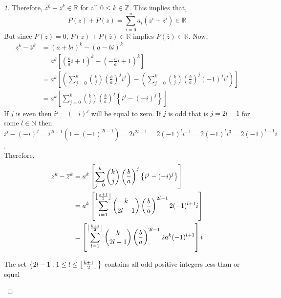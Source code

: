 \begin{proof}[1]
    Therefore, $z^{k} + \overline{z}^{k} \in \mathbb{R}$ for all $0\leq k\in \mathbb{Z}$. This implies that,
    \begin{equation*}
        P(z) + P(\overline{z}) = \sum_{i=0}^{n} a_{i} \left( z^{i} + \overline{z}^{i} \right) \in \mathbb{R} 
    \end{equation*}
    But since $P(z)=0$, $P(z) + P(\overline{z}) \in \mathbb{R}$ implies $P(\overline{z})\in \mathbb{R}$. Now,
    \begin{align*}
        z^{k} - \overline{z}^{k} &= (a+bi)^{k} - (a-bi)^{k} \\
                                 &= a^{k}\left[\left(\frac{b}{a}i + 1\right)^{k} - \left(-\frac{b}{a}i + 1\right)^{k} \right] \\
                                 &= a^{k}
                                 \left[ \left( \sum_{j=0}^{k} {k \choose j} \left(\frac{b}{a}\right)^{j}i^{j}\right) -
                                 \left( \sum_{j=0}^{k} {k \choose j} \left(\frac{b}{a}\right)^{j}(-1)^{j}i^{j} \right)\right] \\
                                 &= a^{k}
                                 \left[\sum_{j=0}^{k} {k \choose j}\left(\frac{b}{a}\right)^{j} \left\{i^{j} - (-i)^{j} 
                                 \right\} \right]
    \end{align*}
    If $j$ is even then $i^{j} - (-i)^{j}$ will be equal to zero. If $j$ is odd that is $j=2l-1$ for some $l\in \mathbb{N}$ then 
    $i^{j} - (-i)^{j} = i^{2l-1} \left( 1 - (-1)^{2l-1} \right)=2i^{2l-1} = 2(-1)^{l}i^{-1} = 2(-1)^{l}i^{3} = 2(-1)^{l+1}i$. \\
    Therefore,
    \begin{align*}
        z^{k} - \overline{z}^{k} &= a^{k} \left[\sum_{j=0}^{k} {k \choose j}\left(\frac{b}{a}\right)^{j} \left\{i^{j} - (-i)^{j} 
                                           \right\} \right] \\
                                           &= a^{k} \left[ \sum_{l=1}^{\left\lfloor \frac{k+1}{2} \right\rfloor} 
                                           {k \choose 2l-1}\left(\frac{b}{a}\right)^{2l-1} 2(-1)^{l+1}i\right] \\
                                           &= \left[ \sum_{l=1}^{\left\lfloor \frac{k+1}{2} \right\rfloor} {k \choose 2l-1}
                                           \left(\frac{b}{a}\right)^{2l-1}2a^{k}(-1)^{l+1} \right]i
    \end{align*}
    \begin{remark}
        The set $\left\{2l-1: 1\leq l \leq \left\lfloor \frac{k+1}{2} \right\rfloor\right\}$ contains all odd positive integers less than or equal 

\end{remark}
\end{proof}
